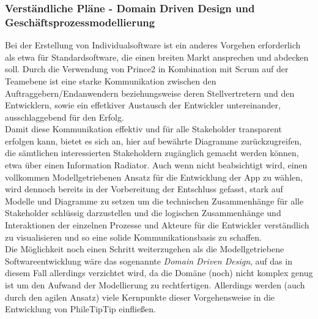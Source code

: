 \newpage

\subsubsection{Verständliche Pläne - Domain Driven Design und Geschäftsprozessmodellierung}

Bei der Erstellung von Individualsoftware ist ein anderes Vorgehen erforderlich als etwa für Standardsoftware, die einen breiten Markt ansprechen und abdecken soll. Durch die Verwendung von Prince2 in Kombination mit Scrum auf der Teamebene ist eine starke Kommunikation zwischen den Auftraggebern/Endanwendern beziehungsweise deren Stellvertretern und den Entwicklern, sowie ein effetkiver Austausch der Entwickler untereinander, ausschlaggebend für den Erfolg.\\

Damit diese Kommunikation effektiv und für alle Stakeholder transparent erfolgen kann, bietet es sich an, hier auf bewährte Diagramme zurückzugreifen, die sämtlichen interessierten Stakeholdern zugänglich gemacht werden können, etwa über einen Information Radiator. Auch wenn nicht beabsichtigt wird, einen vollkommen Modellgetriebenen Ansatz für die Entwicklung der App zu wählen, wird dennoch bereits in der Vorbereitung der Entschluss gefasst, stark auf Modelle und Diagramme zu setzen um die technischen Zusammenhänge für alle Stakeholder schlüssig darzustellen und die logischen Zusammenhänge und Interaktionen der einzelnen Prozesse und Akteure für die Entwickler verständlich zu visualisieren und so eine solide Kommunikationsbasis zu schaffen.\\

Die Möglichkeit noch einen Schritt weiterzugehen als die Modellgetriebene Softwareentwicklung wäre das sogenannte \textit{Domain Driven Design}, auf das in diesem Fall allerdings verzichtet wird, da die Domäne (noch) nicht komplex genug ist um den Aufwand der Modellierung zu rechtfertigen. Allerdings werden (auch durch den agilen Ansatz) viele Kernpunkte dieser Vorgehensweise in die Entwicklung von PhileTipTip einfließen.\\

\newpage
